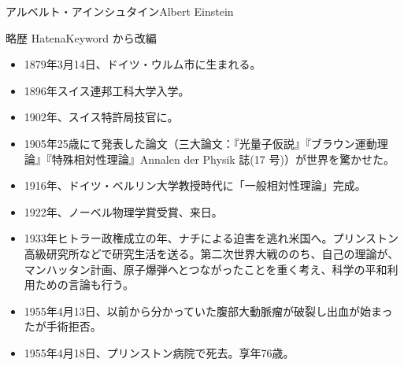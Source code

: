 \documentclass[10pt, dvipdfmx]{beamer}
\begin{document}
\begin{frame}{アルベルト・アインシュタイン}{Albert Einstein}

\begin{block}{略歴 \hfill HatenaKeyword から改編}
\begin{itemize}
\item 1879年3月14日、ドイツ・ウルム市に生まれる。
\item 1896年スイス連邦工科大学入学。
\item 1902年、スイス特許局技官に。
\item 1905年25歳にて発表した論文（三大論文：『光量子仮説』『ブラウン運動理論』『特殊相対性理論』Annalen der Physik 誌(17 号)）が世界を驚かせた。
\item 1916年、ドイツ・ベルリン大学教授時代に「一般相対性理論」完成。
\item 1922年、ノーベル物理学賞受賞、来日。
\item 1933年ヒトラー政権成立の年、ナチによる迫害を逃れ米国へ。プリンストン高級研究所などで研究生活を送る。第二次世界大戦ののち、自己の理論が、マンハッタン計画、原子爆弾へとつながったことを重く考え、科学の平和利用ための言論も行う。
\item 1955年4月13日、以前から分かっていた腹部大動脈瘤が破裂し出血が始まったが手術拒否。
\item 1955年4月18日、プリンストン病院で死去。享年76歳。
\end{itemize}
\end{block}
\end{frame}
\end{document}
